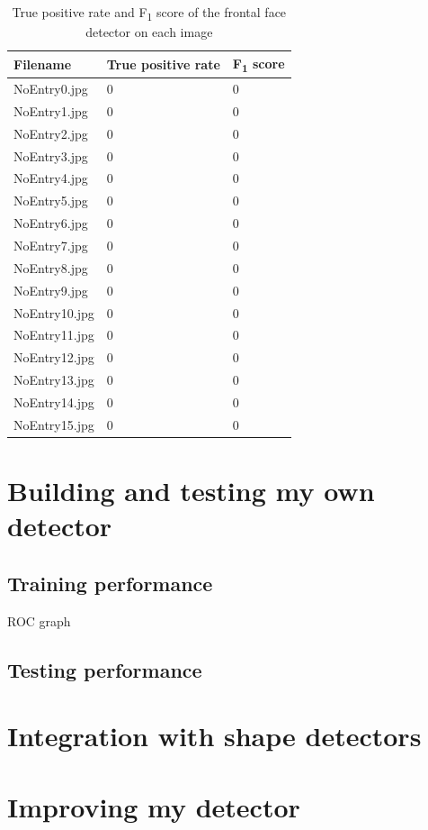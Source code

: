 \documentclass[onecolumn, 11pt, a4paper]{article}
\begin{document}
\begin{table}[H]
  \begin{center}
    \caption{\label{tab:face}True positive rate and F\textsubscript{1} score of the frontal face detector on each image}
    \begin{tabular}{l l l} 
      \hline\hline
      Filename & True positive rate & F\textsubscript{1} score\\
      \hline
      NoEntry0.jpg & 0 & 0 \\ 
      NoEntry1.jpg & 0 & 0 \\ 
      NoEntry2.jpg & 0 & 0 \\ 
      NoEntry3.jpg & 0 & 0 \\ 
      NoEntry4.jpg & 0 & 0 \\ 
      NoEntry5.jpg & 0 & 0 \\ 
      NoEntry6.jpg & 0 & 0 \\ 
      NoEntry7.jpg & 0 & 0 \\ 
      NoEntry8.jpg & 0 & 0 \\ 
      NoEntry9.jpg & 0 & 0 \\ 
      NoEntry10.jpg & 0 & 0 \\ 
      NoEntry11.jpg & 0 & 0 \\ 
      NoEntry12.jpg & 0 & 0 \\ 
      NoEntry13.jpg & 0 & 0 \\ 
      NoEntry14.jpg & 0 & 0 \\ 
      NoEntry15.jpg & 0 & 0 \\ 
      \hline
    \end{tabular}
  \end{center}
\end{table}

\section{Building and testing my own detector}

\subsection{Training performance}

ROC graph

\subsection{Testing performance}

\section{Integration with shape detectors}

\section{Improving my detector}



\clearpage
\begin{thebibliography}{9}
\end{thebibliography}
    
\end{document}
